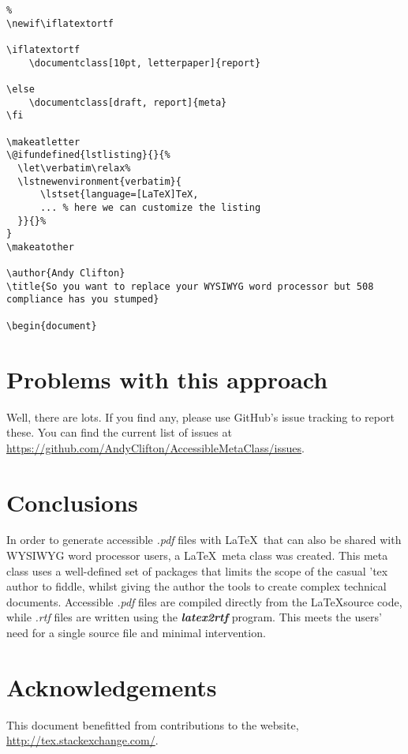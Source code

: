 \documentclass[12pt,letterpaper]{article}
\newcommand{\fn}[1]{\emph{#1}}
\newcommand{\packagename}[1]{\textbf{\emph{#1}}}
\begin{document}
\begin{verbatim}%
\newif\iflatextortf

\iflatextortf
    \documentclass[10pt, letterpaper]{report}
    
\else
    \documentclass[draft, report]{meta} 
\fi

\makeatletter
\@ifundefined{lstlisting}{}{%
  \let\verbatim\relax%
  \lstnewenvironment{verbatim}{
      \lstset{language=[LaTeX]TeX,
      ... % here we can customize the listing
  }}{}%
}
\makeatother

\author{Andy Clifton}
\title{So you want to replace your WYSIWYG word processor but 508 compliance has you stumped}
 
\begin{document}

\end{verbatim}

\section{Problems with this approach}
Well, there are lots. If you find any, please use GitHub's issue tracking to report these. You can find the current list of issues at  \url{https://github.com/AndyClifton/AccessibleMetaClass/issues}.

\section{Conclusions}
In order to generate accessible \fn{.pdf} files with \LaTeX\ that can also be shared with WYSIWYG word processor users, a \LaTeX\ meta class was created. This meta class uses a well-defined set of packages that limits the scope of the casual 'tex author to fiddle, whilst giving the author the tools to create complex technical documents. Accessible \fn{.pdf} files are compiled directly from the \LaTeX source code, while \fn{.rtf} files are written using the \packagename{latex2rtf} program. This meets the users' need for a single source file and minimal intervention.

\section*{Acknowledgements}
This document benefitted from contributions to the website, \url{http://tex.stackexchange.com/}.
\end{document}
